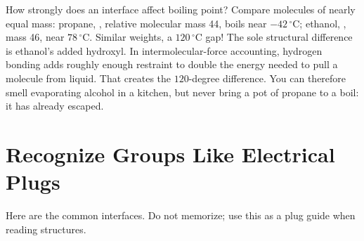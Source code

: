 \begin{qiaoliang}
How strongly does an interface affect boiling point? Compare molecules of nearly equal mass: propane, , relative molecular mass 44, boils near $-42\,^{\circ}\mathrm{C}$; ethanol, , mass 46, near $78\,^{\circ}\mathrm{C}$. Similar weights, a $120\,^{\circ}\mathrm{C}$ gap! The sole structural difference is ethanol's added hydroxyl. In intermolecular-force accounting, hydrogen bonding adds roughly enough restraint to double the energy needed to pull a molecule from liquid. That creates the $120$-degree difference. You can therefore smell evaporating alcohol in a kitchen, but never bring a pot of propane to a boil: it has already escaped.
\end{qiaoliang}

\section{Recognize Groups Like Electrical Plugs}

Here are the common interfaces. Do not memorize; use this as a plug guide when reading structures.

